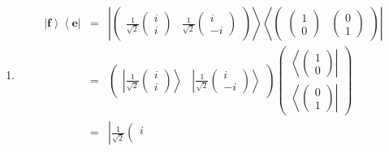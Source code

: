 \documentclass[aps,preprint]{revtex4}
\begin{document}
\begin{enumerate}
\item 
\begin{eqnarray}
\left\vert \boldsymbol{f}\right\rangle \left\langle \boldsymbol{e}%
\right\vert &=&\left\vert \left( 
\begin{array}{cc}
\frac{1}{\sqrt{2}}\left( 
\begin{array}{c}
i \\ 
i%
\end{array}%
\right) & \frac{1}{\sqrt{2}}\left( 
\begin{array}{c}
i \\ 
-i%
\end{array}%
\right)%
\end{array}%
\right) \right\rangle \left\langle \left( 
\begin{array}{cc}
\left( 
\begin{array}{c}
1 \\ 
0%
\end{array}%
\right) & \left( 
\begin{array}{c}
0 \\ 
1%
\end{array}%
\right)%
\end{array}%
\right) \right\vert \\
&=&\left( 
\begin{array}{cc}
\left\vert \frac{1}{\sqrt{2}}\left( 
\begin{array}{c}
i \\ 
i%
\end{array}%
\right) \right\rangle & \left\vert \frac{1}{\sqrt{2}}\left( 
\begin{array}{c}
i \\ 
-i%
\end{array}%
\right) \right\rangle%
\end{array}%
\right) \left( 
\begin{array}{c}
\left\langle \left( 
\begin{array}{c}
1 \\ 
0%
\end{array}%
\right) \right\vert \\ 
\left\langle \left( 
\begin{array}{c}
0 \\ 
1%
\end{array}%
\right) \right\vert%
\end{array}%
\right) \\
&=&\left\vert \frac{1}{\sqrt{2}}\left( 
\begin{array}{c}
i \\ 

\end{array}
\end{eqnarray}
\end{enumerate}
\end{document}
